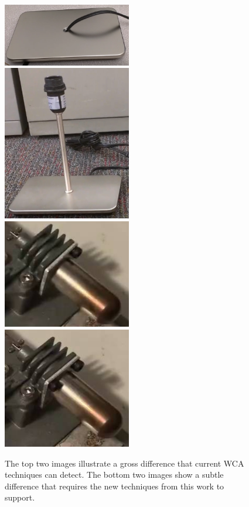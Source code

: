 \begin{figure}
  \includegraphics[width=0.5\textwidth]{figures/coarse_fine/lamp_base.png}
  \includegraphics[width=0.5\textwidth]{figures/coarse_fine/lamp_pipe.png}
  \includegraphics[width=0.5\textwidth]{figures/coarse_fine/stirling_1screw.png}
  \includegraphics[width=0.5\textwidth]{figures/coarse_fine/stirling_2screws.png}
  \caption{
    The top two images illustrate a gross difference that current WCA techniques
    can detect.
    The bottom two images show a subtle difference that requires the new
    techniques from this work to support.
  }\label{fig:subtle_gross}
\end{figure}

